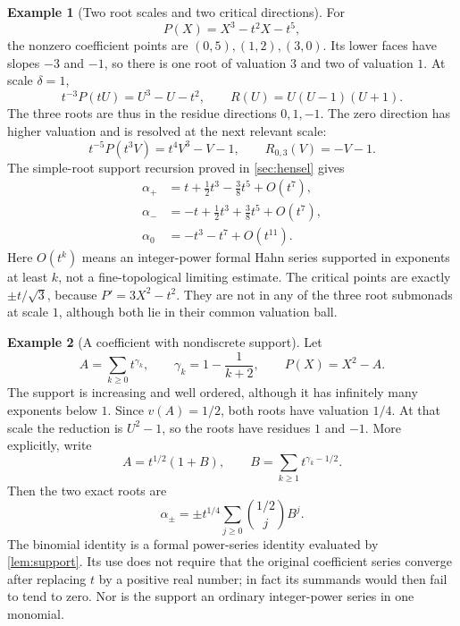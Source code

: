 \documentclass[11pt,letterpaper]{article}
\numberwithin{equation}{section}
\theoremstyle{definition}
\newtheorem{example}[example]{Example}
\theoremstyle{remark}
\begin{document}
\begin{example}[Two root scales and two critical directions]\label{ex:cubicnewton}
For
\begin{equation}\label{eq:cubicnewton}
 P(X)=X^3-t^2X-t^5,
\end{equation}
the nonzero coefficient points are $(0,5),(1,2),(3,0)$. Its lower faces
have slopes $-3$ and $-1$, so there is one root of valuation $3$ and two
of valuation $1$. At scale $\delta=1$,
\[
 t^{-3}P(tU)=U^3-U-t^2,\qquad R(U)=U(U-1)(U+1).
\]
The three roots are thus in the residue directions $0,1,-1$. The zero
direction has higher valuation and is resolved at the next relevant scale:
\[
 t^{-5}P(t^3V)=t^4V^3-V-1,\qquad R_{0,3}(V)=-V-1.
\]
The simple-root support recursion proved in \cref{sec:hensel} gives
\begin{align}
 \alpha_+&=t+\tfrac12t^3-\tfrac38t^5+O(t^7),\\
 \alpha_-&=-t+\tfrac12t^3+\tfrac38t^5+O(t^7),\\
 \alpha_0&=-t^3-t^7+O(t^{11}).
\end{align}
Here $O(t^k)$ means an integer-power formal Hahn series supported in
exponents at least $k$, not a fine-topological limiting estimate.
The critical points are exactly $\pm t/\sqrt3$, because
$P'=3X^2-t^2$. They are not in any of the three root submonads at scale
$1$, although both lie in their common valuation ball.
\end{example}

\begin{example}[A coefficient with nondiscrete support]\label{ex:nondiscrete}
Let
\[
 A=\sum_{k\ge0}t^{\gamma_k},\qquad
 \gamma_k=1-\frac1{k+2},\qquad P(X)=X^2-A.
\]
The support is increasing and well ordered, although it has infinitely
many exponents below $1$. Since $v(A)=1/2$, both roots have valuation
$1/4$. At that scale the reduction is $U^2-1$, so the roots have residues
$1$ and $-1$. More explicitly, write
\[
 A=t^{1/2}(1+B),\qquad
 B=\sum_{k\ge1}t^{\gamma_k-1/2}.
\]
Then the two exact roots are
\begin{equation}\label{eq:binomialhahn}
 \alpha_\pm=\pm t^{1/4}\sum_{j\ge0}\binom{1/2}{j}B^j.
\end{equation}
The binomial identity is a formal power-series identity evaluated by
\cref{lem:support}. Its use does not require that the original coefficient
series converge after replacing $t$ by a positive real number; in fact its
summands would then fail to tend to zero. Nor is the support an ordinary
integer-power series in one monomial.
\end{example}
\end{document}
